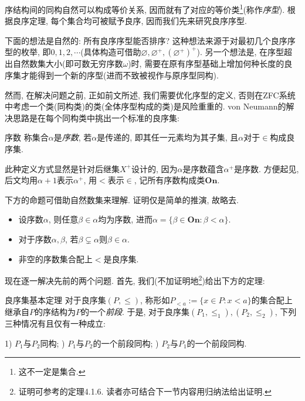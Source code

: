 序结构间的同构自然可以构成等价关系, 因而就有了对应的等价类\footnote{这不一定是集合. }(称作\textit{序型}). 根据良序定理, 每个集合均可被赋予良序, 因而我们先来研究良序序型. 

下面的想法是自然的: 所有良序序型能否排序? 这种想法来源于对最初几个良序序型的枚举, 即$0,1,2,\cdots$(具体构造可借助$\varnothing , \varnothing ^{+}, (\varnothing ^+)^+$). 另一个想法是, 在序型超出自然数集大小(即可数无穷序数$\omega$)时, 需要在原有序型基础上增加何种长度的良序集才能得到一个新的序型(进而不致被视作与原序型同构). 

然而, 在解决问题之前, 正如前文所述, 我们需要优化序型的定义, 否则在ZFC系统中考虑一个类(同构类)的类(全体序型构成的类)是风险重重的. von Neumann的解决思路是在每个同构类中挑出一个标准的良序集: 

\begin{definition}{序数}
	称集合$\alpha$是\textit{序数}, 若$\alpha$是传递的, 即其任一元素均为其子集, 且$\alpha$对于$\in$构成良序集. 
\end{definition}

此种定义方式显然是针对后继集$X^+$设计的, 因为$\alpha$是序数蕴含$\alpha ^+$是序数. 方便起见, 后文均用$\alpha +1$表示$\alpha ^+$, 用$<$表示$\in$, 记所有序数构成类$\mathbf{On}$. 

下方的命题可借助自然数集来理解. 证明仅是简单的推演, 故略去. 

\begin{proposition}{}
	\vspace{-2em}
	\begin{itemize}
		\item 设序数$\alpha$, 则任意$\beta \in \alpha$均为序数, 进而$\alpha = \{ \beta \in \mathbf{On} : \beta < \alpha \}$. 
		\item 对于序数$\alpha ,\beta$, 若$\beta \subsetneq \alpha $则$\beta \in \alpha$. 
		\item 非空的序数集合配上$<$是良序集. 
	\end{itemize}
\end{proposition}

现在逐一解决先前的两个问题. 首先, 我们(不加证明地\footnote{证明可参考\cite{set_theory_Hao}的定理4.1.6. 读者亦可结合下一节内容用归纳法给出证明. })给出下方的定理: 

\begin{theorem}{良序集基本定理}
	对于良序集$(P,\leq )$, 称形如$P_{<a}:=\{ x \in P:x<a \}$的集合配上继承自$P$的序结构为$P$的一个\textit{前段}. 于是, 对于良序集$(P_1,\leq _1),(P_2,\leq _2)$, 下列三种情况有且仅有一种成立: 
	\begin{center}
		1) $P_1$与$P_2$同构; ) $P_1$与$P_2$的一个前段同构; ) $P_2$与$P_1$的一个前段同构. 
	\end{center}
\end{theorem}

